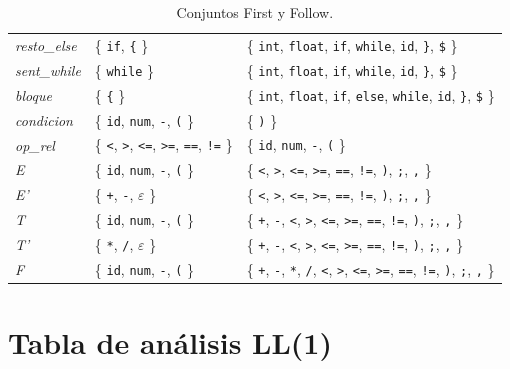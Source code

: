 \documentclass[12pt]{article}
\newcommand{\nt}[1]{\textit{#1}}
\begin{document}
\begin{table}[!htbp]
\begin{tabular}{@{}l >{\raggedright\arraybackslash}p{5.5cm} >{\raggedright\arraybackslash}p{6.3cm}@{}}
\nt{resto\_else} & \{ \texttt{if}, \texttt{\{} \} & \{ \texttt{int}, \texttt{float}, \texttt{if}, \texttt{while}, \texttt{id}, \texttt{\}}, \texttt{\$} \} \\
\nt{sent\_while} & \{ \texttt{while} \} & \{ \texttt{int}, \texttt{float}, \texttt{if}, \texttt{while}, \texttt{id}, \texttt{\}}, \texttt{\$} \} \\
\nt{bloque} & \{ \texttt{\{} \} & \{ \texttt{int}, \texttt{float}, \texttt{if}, \texttt{else}, \texttt{while}, \texttt{id}, \texttt{\}}, \texttt{\$} \} \\
\nt{condicion} & \{ \texttt{id}, \texttt{num}, \texttt{-}, \texttt{(} \} & \{ \texttt{)} \} \\
\nt{op\_rel} & \{ \texttt{<}, \texttt{>}, \texttt{<=}, \texttt{>=}, \texttt{==}, \texttt{!=} \} & \{ \texttt{id}, \texttt{num}, \texttt{-}, \texttt{(} \} \\
\nt{E} & \{ \texttt{id}, \texttt{num}, \texttt{-}, \texttt{(} \} & \{ \texttt{<}, \texttt{>}, \texttt{<=}, \texttt{>=}, \texttt{==}, \texttt{!=}, \texttt{)}, \texttt{;}, \texttt{,} \} \\
\nt{E'} & \{ \texttt{+}, \texttt{-}, $\varepsilon$ \} & \{ \texttt{<}, \texttt{>}, \texttt{<=}, \texttt{>=}, \texttt{==}, \texttt{!=}, \texttt{)}, \texttt{;}, \texttt{,} \} \\
\nt{T} & \{ \texttt{id}, \texttt{num}, \texttt{-}, \texttt{(} \} & \{ \texttt{+}, \texttt{-}, \texttt{<}, \texttt{>}, \texttt{<=}, \texttt{>=}, \texttt{==}, \texttt{!=}, \texttt{)}, \texttt{;}, \texttt{,} \} \\
\nt{T'} & \{ \texttt{*}, \texttt{/}, $\varepsilon$ \} & \{ \texttt{+}, \texttt{-}, \texttt{<}, \texttt{>}, \texttt{<=}, \texttt{>=}, \texttt{==}, \texttt{!=}, \texttt{)}, \texttt{;}, \texttt{,} \} \\
\nt{F} & \{ \texttt{id}, \texttt{num}, \texttt{-}, \texttt{(} \} & \{ \texttt{+}, \texttt{-}, \texttt{*}, \texttt{/}, \texttt{<}, \texttt{>}, \texttt{<=}, \texttt{>=}, \texttt{==}, \texttt{!=}, \texttt{)}, \texttt{;}, \texttt{,} \} \\
\bottomrule
\end{tabular}
\caption{Conjuntos First y Follow.}
\label{tab:firstfollow}
\end{table}

\section{Tabla de análisis LL(1)}
\label{sec:tabla}
\end{document}
